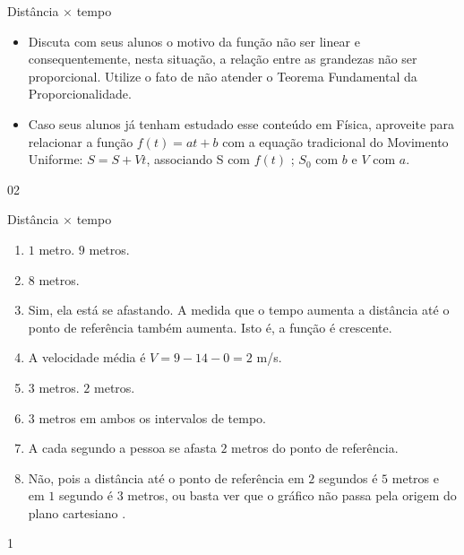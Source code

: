 \begin{sugestions}{Distância $\times$ tempo}
{\begin{itemize}
\begin{figure}[H]
\end{figure}


\item Discuta com seus alunos o motivo da função não ser linear e consequentemente, nesta situação, a relação entre as grandezas não ser proporcional. Utilize o fato de não atender o Teorema Fundamental da Proporcionalidade.

\item Caso seus alunos já tenham estudado esse conteúdo em Física, aproveite para relacionar a função $f(t)=at+b$ com a equação tradicional do Movimento Uniforme: $S=S+Vt$, associando S com $f(t)$ ; $S_0$ com $b$ e $V$ com $a$.
 
\end{itemize}
}{0}{2}
\end{sugestions}
\marginpar{\vspace{.5em}}
\begin{answer}{Distância $\times$ tempo}
{
\begin{enumerate}
\item $1$ metro. $9$ metros.
\item $8$ metros.
\item Sim, ela está se afastando. A medida que o tempo aumenta a distância até o ponto de referência também aumenta. Isto é, a função é crescente.
\item A velocidade média é $V=9−14−0=2$ m/s.
\item $3$ metros. $2$ metros.
\item $3$ metros em ambos os intervalos de tempo.
\item A cada segundo a pessoa se afasta $2$ metros do ponto de referência.
\item Não, pois a distância até o ponto de referência em $2$ segundos é $5$ metros e em $1$ segundo é $3$ metros, ou basta ver que o gráfico não passa pela origem do plano cartesiano .
\end{enumerate}
}{1}
\end{answer}
\label{\detokenize{AF107-4:sec-funcao-afim}}\label{\detokenize{AF107-4::doc}}\label{\detokenize{AF107-4:explorando-funcao-afim}}

